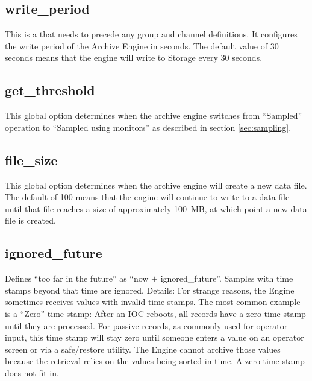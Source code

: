 



\clearpage

\subsection{write\_period}
This is a  that needs to precede any group and
channel definitions.  It configures the write period of the Archive
Engine in seconds. The default value of 30 seconds means that the
engine will write to Storage every 30 seconds.

\subsection{get\_threshold} \label{sec:getthreshold}
This global option determines when the archive engine switches from
``Sampled'' operation to ``Sampled using monitors'' as described in
section \ref{sec:sampling}.

\subsection{file\_size}
This global option determines when the archive engine will create a
new data file. The default of 100 means that the engine will continue
to write to a data file until that file reaches a size of
approximately 100~MB, at which point a new data file is created.

\subsection{ignored\_future}
Defines ``too far in the future'' as ``now $+$ ignored\_future''.
Samples with time stamps beyond that time are ignored.  Details: For
strange reasons, the Engine sometimes receives values with invalid
time stamps. The most common example is a ``Zero'' time stamp: After
an IOC reboots, all records have a zero time stamp until they are
processed. For passive records, as commonly used for operator input,
this time stamp will stay zero until someone enters a value on an
operator screen or via a safe/restore utility. The Engine cannot
archive those values because the retrieval relies on the values being
sorted in time. A zero time stamp does not fit in.

